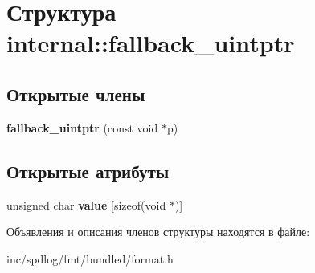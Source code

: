 \hypertarget{structinternal_1_1fallback__uintptr}{}\section{Структура internal\+:\+:fallback\+\_\+uintptr}
\label{structinternal_1_1fallback__uintptr}
\subsection*{Открытые члены}
\begin{DoxyCompactItemize}
\item 
\mbox{\label{structinternal_1_1fallback__uintptr_a7e4d7ac3cbf8abeebdc6100e4a703854}} 
{\bfseries fallback\+\_\+uintptr} (const void $\ast$p)
\end{DoxyCompactItemize}
\subsection*{Открытые атрибуты}
\begin{DoxyCompactItemize}
\item 
\mbox{\label{structinternal_1_1fallback__uintptr_abb60335c278c1d4de7259b236b7a0204}} 
unsigned char {\bfseries value} \mbox{[}sizeof(void $\ast$)\mbox{]}
\end{DoxyCompactItemize}


Объявления и описания членов структуры находятся в файле\+:\begin{DoxyCompactItemize}
\item 
inc/spdlog/fmt/bundled/format.\+h\end{DoxyCompactItemize}
